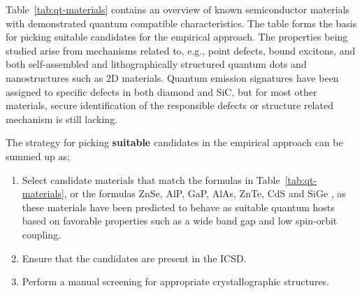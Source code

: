 \documentclass[superscriptaddress,unsortedaddress,
 amsmath,amssymb,
 aps,
]{revtex4-2}
\begin{document}
Table~\ref{tab:qt-materials} contains an overview of known semiconductor materials with demonstrated quantum compatible characteristics. The table forms the basis for picking suitable candidates for the empirical approach. The properties being studied arise from mechanisms related to, e.g., point defects, bound excitons, and both self-assembled and lithographically structured quantum dots and nanostructures such as 2D materials. 
Quantum emission signatures have been assigned to specific defects in both diamond and SiC, but for most other materials, secure identification of the responsible defects or structure related mechanism is still lacking.  

The strategy for picking \textbf{suitable} candidates in the empirical approach can be summed up as;  
\begin{enumerate}
    \item Select candidate materials that match the formulas in  Table~\ref{tab:qt-materials}, or the formulas ZnSe, AlP, GaP, AlAs, ZnTe, CdS \cite{Weber2010} and SiGe \cite{Hardy2019}, as these materials have been predicted to behave as suitable quantum hosts based on favorable properties such as a wide band gap and low spin-orbit coupling.  
    \item Ensure that the candidates are present in the ICSD.  
    \item Perform a manual screening for appropriate crystallographic structures. 
\end{enumerate}
\end{document}
